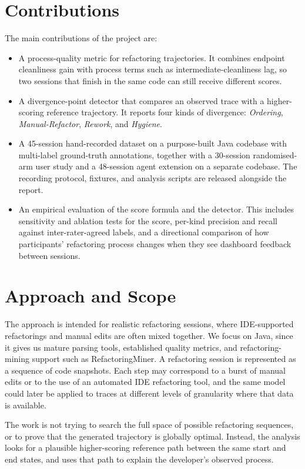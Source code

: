 \section{Contributions}

The main contributions of the project are:

\begin{itemize}
  \item A process-quality metric for refactoring trajectories. It combines endpoint cleanliness gain with process terms such as intermediate-cleanliness lag, so two sessions that finish in the same code can still receive different scores.
  \item A divergence-point detector that compares an observed trace with a higher-scoring reference trajectory. It reports four kinds of divergence: \emph{Ordering}, \emph{Manual-Refactor}, \emph{Rework}, and \emph{Hygiene}.
  \item A 45-session hand-recorded dataset on a purpose-built Java codebase with multi-label ground-truth annotations, together with a 30-session randomised-arm user study and a 48-session agent extension on a separate codebase. The recording protocol, fixtures, and analysis scripts are released alongside the report.
  \item An empirical evaluation of the score formula and the detector. This includes sensitivity and ablation tests for the score, per-kind precision and recall against inter-rater-agreed labels, and a directional comparison of how participants' refactoring process changes when they see dashboard feedback between sessions.
\end{itemize}

\section{Approach and Scope}

The approach is intended for realistic refactoring sessions, where IDE-supported refactorings and manual edits are often mixed together. We focus on Java, since it gives us mature parsing tools, established quality metrics, and refactoring-mining support such as RefactoringMiner. A refactoring session is represented as a sequence of code snapshots. Each step may correspond to a burst of manual edits or to the use of an automated IDE refactoring tool, and the same model could later be applied to traces at different levels of granularity where that data is available.

The work is not trying to search the full space of possible refactoring sequences, or to prove that the generated trajectory is globally optimal. Instead, the analysis looks for a plausible higher-scoring reference path between the same start and end states, and uses that path to explain the developer's observed process.

